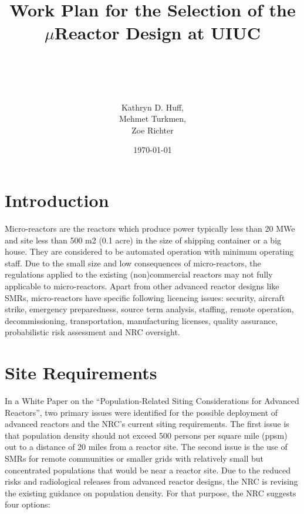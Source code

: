 \documentclass[10pt,a4paper]{article}
\begin{document}
\title{Work Plan for the Selection of the $\mu$Reactor Design at UIUC\\}
\author{\\ \\ \\ \\ Kathryn D. Huff,\\
Mehmet Turkmen,\\
Zoe Richter}
\date{\today}
\maketitle

\pagebreak
\tableofcontents


\printglossary


\pagebreak
\section{Introduction}
Micro-reactors are the reactors which produce power typically less than 20 MWe and site less than 500 m2 (0.1 acre) in the size of shipping container or a big house. They are considered to be automated operation with minimum operating staff. Due to the small size and low consequences of micro-reactors, the regulations applied to the existing (non)commercial reactors may not fully applicable to micro-reactors. Apart from other advanced reactor designs like \gls{SMR}s, micro-reactors have specific following licencing issues: security, aircraft strike, emergency preparedness, source term analysis, staffing, remote operation, decommissioning, transportation, manufacturing licenses, quality assurance, probabilistic risk assessment and \gls{NRC} oversight.

\pagebreak


\pagebreak
\section{Site Requirements}

In a White Paper \cite{nrc_staff_population-related_2019} on the “Population-Related Siting Considerations for Advanced Reactors”, two primary issues were identified for the possible deployment of advanced reactors and the NRC’s current siting requirements. The first issue is that population density should not exceed 500 persons per square mile (ppsm) out to a distance of 20 miles from a reactor site. The second issue is the use of SMRs for remote communities or smaller grids with relatively small but concentrated populations that would be near a reactor site. Due to the reduced risks and radiological releases from advanced reactor designs, the NRC is revising the existing guidance on population density.  For that purpose, the NRC suggests four options:
\end{document}

